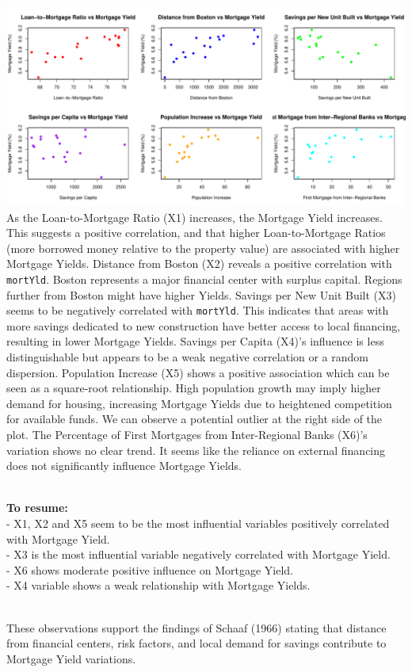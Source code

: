 \documentclass[
  11pt,
]{article}
\begin{document}
\includegraphics{Figs/unnamed-chunk-6-1.pdf}\\
As the Loan-to-Mortgage Ratio (X1) increases, the Mortgage Yield
increases. This suggests a positive correlation, and that higher
Loan-to-Mortgage Ratios (more borrowed money relative to the property
value) are associated with higher Mortgage Yields. Distance from Boston
(X2) reveals a positive correlation with \texttt{mortYld}. Boston
represents a major financial center with surplus capital. Regions
further from Boston might have higher Yields. Savings per New Unit Built
(X3) seems to be negatively correlated with \texttt{mortYld}. This
indicates that areas with more savings dedicated to new construction
have better access to local financing, resulting in lower Mortgage
Yields. Savings per Capita (X4)'s influence is less distinguishable but
appears to be a weak negative correlation or a random dispersion.
Population Increase (X5) shows a positive association which can be seen
as a square-root relationship. High population growth may imply higher
demand for housing, increasing Mortgage Yields due to heightened
competition for available funds. We can observe a potential outlier at
the right side of the plot. The Percentage of First Mortgages from
Inter-Regional Banks (X6)'s variation shows no clear trend. It seems
like the reliance on external financing does not significantly influence
Mortgage Yields.\\
\strut \\
\textbf{To resume:}\\
- X1, X2 and X5 seem to be the most influential variables positively
correlated with Mortgage Yield.\\
- X3 is the most influential variable negatively correlated with
Mortgage Yield.\\
- X6 shows moderate positive influence on Mortgage Yield.\\
- X4 variable shows a weak relationship with Mortgage Yields.\\
\strut \\
These observations support the findings of Schaaf (1966) stating that
distance from financial centers, risk factors, and local demand for
savings contribute to Mortgage Yield variations.\\
\end{document}
